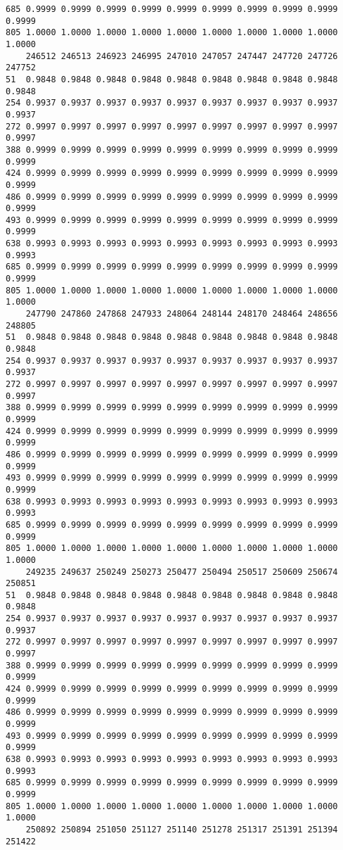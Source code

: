 \documentclass[
]{report}
\begin{document}
\begin{verbatim}
685 0.9999 0.9999 0.9999 0.9999 0.9999 0.9999 0.9999 0.9999 0.9999 0.9999
805 1.0000 1.0000 1.0000 1.0000 1.0000 1.0000 1.0000 1.0000 1.0000 1.0000
    246512 246513 246923 246995 247010 247057 247447 247720 247726 247752
51  0.9848 0.9848 0.9848 0.9848 0.9848 0.9848 0.9848 0.9848 0.9848 0.9848
254 0.9937 0.9937 0.9937 0.9937 0.9937 0.9937 0.9937 0.9937 0.9937 0.9937
272 0.9997 0.9997 0.9997 0.9997 0.9997 0.9997 0.9997 0.9997 0.9997 0.9997
388 0.9999 0.9999 0.9999 0.9999 0.9999 0.9999 0.9999 0.9999 0.9999 0.9999
424 0.9999 0.9999 0.9999 0.9999 0.9999 0.9999 0.9999 0.9999 0.9999 0.9999
486 0.9999 0.9999 0.9999 0.9999 0.9999 0.9999 0.9999 0.9999 0.9999 0.9999
493 0.9999 0.9999 0.9999 0.9999 0.9999 0.9999 0.9999 0.9999 0.9999 0.9999
638 0.9993 0.9993 0.9993 0.9993 0.9993 0.9993 0.9993 0.9993 0.9993 0.9993
685 0.9999 0.9999 0.9999 0.9999 0.9999 0.9999 0.9999 0.9999 0.9999 0.9999
805 1.0000 1.0000 1.0000 1.0000 1.0000 1.0000 1.0000 1.0000 1.0000 1.0000
    247790 247860 247868 247933 248064 248144 248170 248464 248656 248805
51  0.9848 0.9848 0.9848 0.9848 0.9848 0.9848 0.9848 0.9848 0.9848 0.9848
254 0.9937 0.9937 0.9937 0.9937 0.9937 0.9937 0.9937 0.9937 0.9937 0.9937
272 0.9997 0.9997 0.9997 0.9997 0.9997 0.9997 0.9997 0.9997 0.9997 0.9997
388 0.9999 0.9999 0.9999 0.9999 0.9999 0.9999 0.9999 0.9999 0.9999 0.9999
424 0.9999 0.9999 0.9999 0.9999 0.9999 0.9999 0.9999 0.9999 0.9999 0.9999
486 0.9999 0.9999 0.9999 0.9999 0.9999 0.9999 0.9999 0.9999 0.9999 0.9999
493 0.9999 0.9999 0.9999 0.9999 0.9999 0.9999 0.9999 0.9999 0.9999 0.9999
638 0.9993 0.9993 0.9993 0.9993 0.9993 0.9993 0.9993 0.9993 0.9993 0.9993
685 0.9999 0.9999 0.9999 0.9999 0.9999 0.9999 0.9999 0.9999 0.9999 0.9999
805 1.0000 1.0000 1.0000 1.0000 1.0000 1.0000 1.0000 1.0000 1.0000 1.0000
    249235 249637 250249 250273 250477 250494 250517 250609 250674 250851
51  0.9848 0.9848 0.9848 0.9848 0.9848 0.9848 0.9848 0.9848 0.9848 0.9848
254 0.9937 0.9937 0.9937 0.9937 0.9937 0.9937 0.9937 0.9937 0.9937 0.9937
272 0.9997 0.9997 0.9997 0.9997 0.9997 0.9997 0.9997 0.9997 0.9997 0.9997
388 0.9999 0.9999 0.9999 0.9999 0.9999 0.9999 0.9999 0.9999 0.9999 0.9999
424 0.9999 0.9999 0.9999 0.9999 0.9999 0.9999 0.9999 0.9999 0.9999 0.9999
486 0.9999 0.9999 0.9999 0.9999 0.9999 0.9999 0.9999 0.9999 0.9999 0.9999
493 0.9999 0.9999 0.9999 0.9999 0.9999 0.9999 0.9999 0.9999 0.9999 0.9999
638 0.9993 0.9993 0.9993 0.9993 0.9993 0.9993 0.9993 0.9993 0.9993 0.9993
685 0.9999 0.9999 0.9999 0.9999 0.9999 0.9999 0.9999 0.9999 0.9999 0.9999
805 1.0000 1.0000 1.0000 1.0000 1.0000 1.0000 1.0000 1.0000 1.0000 1.0000
    250892 250894 251050 251127 251140 251278 251317 251391 251394 251422

\end{verbatim}
\end{document}
